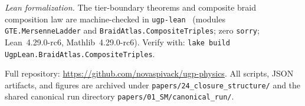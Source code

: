 \documentclass[12pt,a4paper]{article}
\begin{document}
\emph{Lean formalization.}
The tier-boundary theorems and composite braid composition law are machine-checked
in \texttt{ugp-lean}~\cite{ugp-lean}
(modules \texttt{GTE.Mersenne\-Ladder} and
\texttt{Braid\-Atlas.\allowbreak{}Composite\-Triples};
zero \texttt{sorry}; Lean~4.29.0-rc6, Mathlib~4.29.0-rc6).
Verify with: \texttt{lake build UgpLean.BraidAtlas.\allowbreak{}CompositeTriples}.

Full repository: \url{https://github.com/novaspivack/ugp-physics}.
All scripts, JSON artifacts, and figures are archived under
\texttt{papers/24\_closure\_structure/} and the shared canonical run directory
\texttt{papers/01\_SM/canonical\_run/}.



\end{document}

